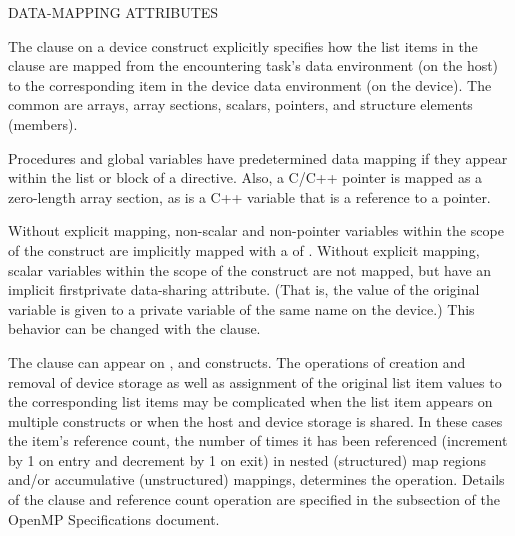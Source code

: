 \bigskip
DATA-MAPPING ATTRIBUTES

The  clause on a device construct explicitly specifies how the list items in
the clause are mapped from the encountering task's data environment (on the host)
to the corresponding item in the device data environment (on the device).
The common  are arrays, array sections, scalars, pointers, and
structure elements (members). 

Procedures and global variables have predetermined data mapping if they appear
within the list or block of a  directive. Also, a C/C++ pointer
is mapped as a zero-length array section, as is a C++ variable that is a reference to a pointer.

Without explicit mapping, non-scalar and non-pointer variables within the scope of the 
construct are implicitly mapped with a  of .
Without explicit mapping, scalar variables within the scope of the 
construct are not mapped, but have an implicit firstprivate data-sharing
attribute. (That is, the value of the original variable is given to a private
variable of the same name on the device.) This behavior can be changed with
the  clause.

The  clause can appear on ,  and 
 constructs.  The operations of creation and
removal of device storage as well as assignment of the original list item 
values to the corresponding list items may be complicated when the list 
item appears on multiple constructs or when the host and device storage 
is shared. In these cases the item's reference count, the number of times
it has been referenced (increment by 1 on entry and decrement by 1 on exit) in nested (structured)
map regions and/or accumulative (unstructured) mappings, determines the operation.
Details of the  clause and reference count operation are specified 
in the  subsection of the OpenMP Specifications document.




















